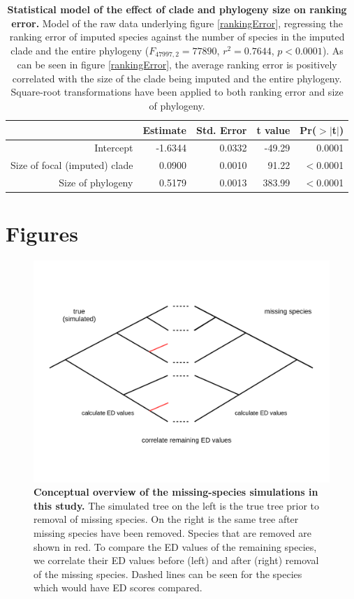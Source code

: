 \documentclass[10pt,english]{article}
\begin{document}
\begin{table}[ht]
  \centering
  \begin{tabular}{rrrrr}
    \hline
   & Estimate & Std. Error & t value & Pr($>$$|$t$|$) \\ \hline
    Intercept & -1.6344 & 0.0332 & -49.29 & 0.0001 \\
    Size of focal (imputed) clade & 0.0900 & 0.0010 & 91.22 & $<$0.0001 \\
    Size of phylogeny & 0.5179 & 0.0013 & 383.99 & $<$0.0001 \\ \hline
  \end{tabular}
  \caption{\textbf{Statistical model of the effect of clade and phylogeny size
      on ranking error.} Model of the raw data underlying figure
      \ref{rankingError}, regressing the ranking error of imputed species
      against the number of species in the imputed clade and the entire
      phylogeny ($F_{47997,2} = 77890$, $r^2 = 0.7644$, $p < 0.0001$). As can be
      seen in figure \ref{rankingError}, the average ranking error is positively
      correlated with the size of the clade being imputed and the entire
      phylogeny. Square-root transformations have been applied to both ranking
      error and size of phylogeny.}
  \label{impute_rank}
\end{table}

\clearpage

\section*{Figures}

\begin{figure}[!ht]
  \center
  \includegraphics[width=.75\textwidth]{../figures/missingSpecies.png}
  \caption{\textbf{Conceptual overview of the missing-species simulations in
  this study.} The simulated tree on the left is the true tree prior to removal
  of missing species. On the right is the same tree after missing species have
  been removed. Species that are removed are shown in red. To compare the ED
  values of the remaining species, we correlate their ED values before (left)
  and after (right) removal of the missing species. Dashed lines can be seen for
  the species which would have ED scores compared.}
  \label{missingSpecies}
\end{figure}
\end{document}
